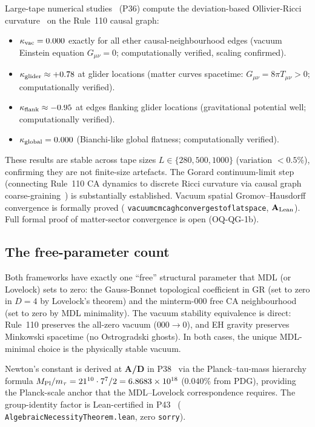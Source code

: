 \documentclass[11pt]{article}
\theoremstyle{remark}
\newcommand{\lean}[1]{%
  \penalty-100
  \begingroup\def\_{\textunderscore\allowbreak}\texttt{#1}\endgroup}
\newcommand{\CatAL}{\ensuremath{\textbf{A}_{\rm Lean}}}
\newcommand{\CatAD}{\textbf{A/D}}
\begin{document}
Large-tape numerical studies~\cite{SpivackEmergentGravity} (P36) compute the
deviation-based Ollivier-Ricci curvature~\cite{Ollivier2007,Ollivier2009} on the
Rule~110 causal graph:
\begin{itemize}[nosep]
  \item $\kappa_{\rm vac} = 0.000$ exactly for all ether causal-neighbourhood edges
    (vacuum Einstein equation $G_{\mu\nu} = 0$; computationally verified, scaling confirmed).
  \item $\kappa_{\rm glider} \approx +0.78$ at glider locations
    (matter curves spacetime: $G_{\mu\nu} = 8\pi T_{\mu\nu} > 0$; computationally verified).
  \item $\kappa_{\rm flank} \approx -0.95$ at edges flanking glider locations
    (gravitational potential well; computationally verified).
  \item $\kappa_{\rm global} = 0.000$ (Bianchi-like global flatness; computationally verified).
\end{itemize}
These results are stable across tape sizes $L \in \{280, 500, 1000\}$ (variation $< 0.5\%$),
confirming they are not finite-size artefacts.
The Gorard continuum-limit step (connecting Rule~110 CA dynamics to discrete
Ricci curvature via causal graph coarse-graining~\cite{Gorard2020Rel}) is substantially
established. Vacuum spatial Gromov--Hausdorff convergence is formally proved
(\lean{vacuum\_cmca\_gh\_converges\_to\_flat\_space}, \CatAL). Full formal proof of
matter-sector convergence is open (OQ-QG-1b).

\subsection{The free-parameter count}

Both frameworks have exactly one ``free'' structural parameter that MDL (or Lovelock)
sets to zero: the Gauss-Bonnet topological coefficient in GR (set to zero in $D=4$
by Lovelock's theorem) and the minterm-000 free CA neighbourhood (set to zero by
MDL minimality). The vacuum stability equivalence is direct: Rule~110 preserves the
all-zero vacuum ($000 \to 0$), and EH gravity preserves Minkowski spacetime
(no Ostrogradski ghosts). In both cases, the unique MDL-minimal choice is the
physically stable vacuum.

Newton's constant is derived at \CatAD{} in P38~\cite{SpivackPhiMDLGravity}
via the Planck--tau-mass hierarchy formula
$M_{\rm Pl}/m_\tau = 21^{10} \cdot 7^7 / 2 = 6.8683 \times 10^{18}$
($0.040\%$ from PDG), providing the Planck-scale anchor that the MDL--Lovelock
correspondence requires. The group-identity factor is Lean-certified in
P43~\cite{SpivackCompleteness} (\lean{AlgebraicNecessityTheorem.lean}, zero \texttt{sorry}).
\end{document}
